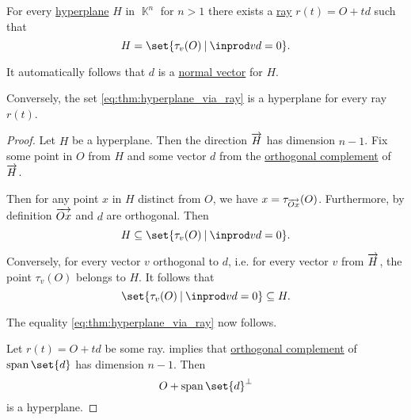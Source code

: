 \begin{proposition}\label{thm:hyperplane_via_ray}
  For every \hyperref[def:affine_hyperplane]{hyperplane} \( H \) in \( \BbbK^n \) for \( n > 1 \) there exists a \hyperref[def:geometric_ray]{ray} \( r(t) = O + td \) such that
  \begin{equation}\label{eq:thm:hyperplane_via_ray}
    H = \set{ \tau_v(O) \given \inprod v d = 0 }.
  \end{equation}

  It automatically follows that \( d \) is a \hyperref[def:normal_vector]{normal vector} for \( H \).

  Conversely, the set \eqref{eq:thm:hyperplane_via_ray} is a hyperplane for every ray \( r(t) \).
\end{proposition}
\begin{proof}
  \SufficiencySubProof Let \( H \) be a hyperplane. Then the direction \( \overrightarrow{H} \) has dimension \( n - 1 \). Fix some point in \( O \) from \( H \) and some vector \( d \) from the \hyperref[def:orthogonal_complement]{orthogonal complement} of \( \overrightarrow{H} \).

  Then for any point \( x \) in \( H \) distinct from \( O \), we have \( x = \tau_{\overrightarrow{Ox}}(O) \). Furthermore, by definition \( \overrightarrow{Ox} \) and \( d \) are orthogonal. Then
  \begin{equation*}
    H \subseteq \set{ \tau_v(O) \given \inprod v d = 0 }.
  \end{equation*}

  Conversely, for every vector \( v \) orthogonal to \( d \), i.e. for every vector \( v \) from \( \overrightarrow{H} \), the point \( \tau_v(O) \) belongs to \( H \). It follows that
  \begin{equation*}
    \set{ \tau_v(O) \given \inprod v d = 0 } \subseteq H.
  \end{equation*}

  The equality \eqref{eq:thm:hyperplane_via_ray} now follows.

  \NecessitySubProof Let \( r(t) = O + td \) be some ray.  implies that \hyperref[def:orthogonal_complement]{orthogonal complement} of \( \linspan\set{ d } \) has dimension \( n - 1 \). Then
  \begin{equation*}
    O + \linspan\set{ d }^\perp
  \end{equation*}
  is a hyperplane.
\end{proof}

